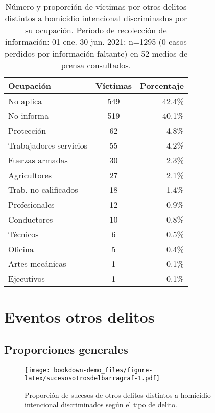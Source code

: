 \documentclass[
]{book}
\begin{document}
\begin{table}[left]

\caption{\label{tab:victimasodelocupaciontable}Número y proporción de víctimas por otros delitos distintos a homicidio intencional discriminados por su ocupación. Período de recolección de información: 01 ene.-30 jun. 2021; n=1295 (0 casos perdidos por información faltante) en 52 medios de prensa consultados.}
\centering
\begin{tabular}[t]{lcr}
\toprule
Ocupación & Víctimas & Porcentaje\\
\midrule
No aplica & 549 & 42.4\%\\
No informa & 519 & 40.1\%\\
Protección & 62 & 4.8\%\\
Trabajadores servicios & 55 & 4.2\%\\
Fuerzas armadas & 30 & 2.3\%\\
\addlinespace
Agricultores & 27 & 2.1\%\\
Trab. no calificados & 18 & 1.4\%\\
Profesionales & 12 & 0.9\%\\
Conductores & 10 & 0.8\%\\
Técnicos & 6 & 0.5\%\\
\addlinespace
Oficina & 5 & 0.4\%\\
Artes mecánicas & 1 & 0.1\%\\
Ejecutivos & 1 & 0.1\%\\
\bottomrule
\end{tabular}
\end{table}

\hypertarget{eventos-otros-delitos}{%
\chapter{Eventos otros delitos}\label{eventos-otros-delitos}}

\hypertarget{proporciones-generales}{%
\section{Proporciones generales}\label{proporciones-generales}}



\begin{figure}
\centering
\texttt{[image: bookdown-demo\_files/figure-latex/sucesosotrosdelbarragraf-1.pdf]}
\caption{\label{fig:sucesosotrosdelbarragraf}Proporción de sucesos de otros delitos distintos a homicidio intencional discriminados según el tipo de delito.}
\end{figure}
\end{document}
